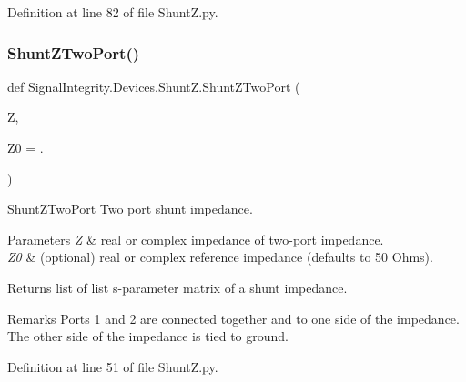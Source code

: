 Definition at line 82 of file Shunt\+Z.\+py.

\mbox{\label{namespaceSignalIntegrity_1_1Devices_1_1ShuntZ_a632e682133ebf3a6d617516e754f9125}} 
\subsubsection{\texorpdfstring{Shunt\+Z\+Two\+Port()}{ShuntZTwoPort()}}
{\footnotesize\ttfamily def Signal\+Integrity.\+Devices.\+Shunt\+Z.\+Shunt\+Z\+Two\+Port (\begin{DoxyParamCaption}\item[{}]{Z,  }\item[{}]{Z0 = {.} }\end{DoxyParamCaption})}



Shunt\+Z\+Two\+Port Two port shunt impedance. 


\begin{DoxyParams}{Parameters}
{\em Z} & real or complex impedance of two-\/port impedance. \\
\hline
{\em Z0} & (optional) real or complex reference impedance (defaults to 50 Ohms). \\
\hline
\end{DoxyParams}
\begin{DoxyReturn}{Returns}
list of list s-\/parameter matrix of a shunt impedance.~\newline
 
\end{DoxyReturn}
\begin{DoxyRemark}{Remarks}
Ports 1 and 2 are connected together and to one side of the impedance.~\newline
 The other side of the impedance is tied to ground. 
\end{DoxyRemark}


Definition at line 51 of file Shunt\+Z.\+py.

